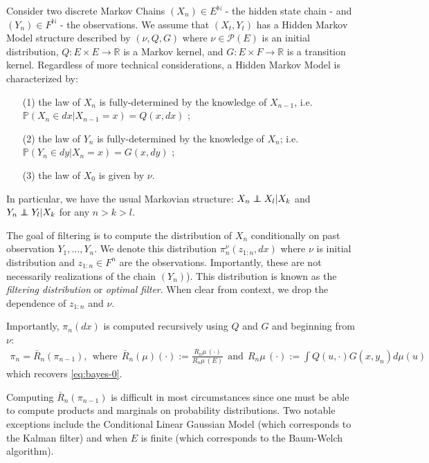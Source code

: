 Consider two discrete Markov Chains $(X_n)\in E^\mathbb N$ - the hidden state chain -  and $(Y_n)\in F^\mathbb N$ - the observations. We assume that $(X_t, Y_t)$ has a Hidden Markov Model structure described by $(\nu, Q, G)$ where $\nu\in\mathcal P(E)$ is an initial distribution, $Q:E\times E \to \mathbb R$ is a Markov kernel, and $G: E\times F \to \mathbb R$ is a transition kernel. Regardless of more technical considerations, a Hidden Markov Model is characterized by:
\begin{enumerate}
\item[(1)] the law of $X_n$ is fully-determined by the knowledge of $X_{n-1}$, i.e. $\mathbb P(X_n\in dx | X_{n-1}=x)=Q(x, dx)$ ;
\item[(2)] the law of $Y_n$ is fully-determined by the knowledge of $X_n$; i.e. $\mathbb P(Y_n\in dy |X_n=x) = G(x, dy)$ ;
\item[(3)] the law of $X_0$ is given by $\nu$.
\end{enumerate}
In particular, we have the usual Markovian structure: $X_n \independent X_l | X_{k}$ and $Y_n \independent Y_l | X_{k}$ for any $n > k > l$.


The goal of filtering is to compute the distribution of $X_n$ conditionally on past observation $Y_1, \ldots, Y_n$. We denote this distribution $\pi_n^\nu(z_{1:n}, dx)$ where $\nu$ is initial distribution and $z_{1:n}\in F^n$ are the observations. Importantly, these are not necessarily realizations of the chain $(Y_n)$). This distribution is known as the \emph{filtering distribution} or \emph{optimal filter}. When clear from context, we drop the dependence of $z_{1:n}$ and $\nu$.

Importantly, $\pi_n(dx)$ is computed recursively using $Q$ and $G$ and beginning from $\nu$:
\begin{align}\label{eq:iteration}
\pi_n = \bar{R}_n(\pi_{n-1}), ~~\textrm{where}~~ \bar{R}_n(\mu)(\cdot) := \frac{R_n \mu \, (\cdot)}{R_n\mu\,(E)} ~~\textrm{and}~~  R_n \mu \, (\cdot) := \int Q(u, \cdot)G(x, y_n) d\mu(u)
\end{align}
which recovers \cref{eq:bayes-0}.

Computing $\bar R_n(\pi_{n-1})$ is difficult in most circumstances since one must be able to compute products and marginals on probability distributions. Two notable exceptions include the Conditional Linear Gaussian Model (which corresponds to the Kalman filter) and when $E$ is finite (which corresponds to the Baum-Welch algorithm).


